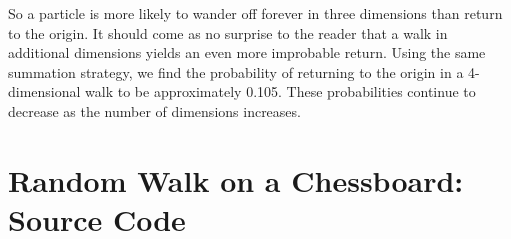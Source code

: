 \documentclass[11pt]{article}
\begin{document}
So a particle is more likely to wander off forever in three dimensions than return to the origin. It should come as no surprise to the reader that a walk in additional dimensions yields an even more improbable return. Using the same summation strategy, we find the probability of returning to the origin in a 4-dimensional walk to be approximately 0.105. These probabilities continue to decrease as the number of dimensions increases. 
\cite{50}

\newpage



\nocite{*}

\newpage

\appendix
\label{appendix}
\section{Random Walk on a Chessboard: Source Code}
\nopagebreak
\end{document}
